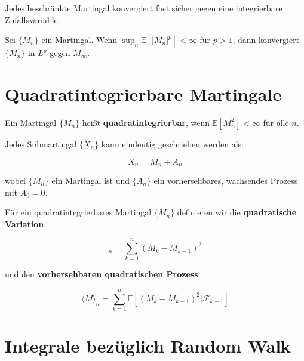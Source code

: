 \begin{corollary}
Jedes beschränkte Martingal konvergiert fast sicher gegen eine integrierbare Zufallsvariable.
\end{corollary}

\begin{theorem}[$L^p$-Konvergenz]
Sei $\{M_n\}$ ein Martingal. Wenn $\sup_n \mathbb{E}[|M_n|^p] < \infty$ für $p > 1$, dann konvergiert $\{M_n\}$ in $L^p$ gegen $M_\infty$.
\end{theorem}

\section{Quadratintegrierbare Martingale}

\begin{definition}
Ein Martingal $\{M_n\}$ heißt \textbf{quadratintegrierbar}, wenn $\mathbb{E}[M_n^2] < \infty$ für alle $n$.
\end{definition}

\begin{theorem}
Jedes Submartingal $\{X_n\}$ kann eindeutig geschrieben werden als:

\begin{equation}
X_n = M_n + A_n
\end{equation}

wobei $\{M_n\}$ ein Martingal ist und $\{A_n\}$ ein vorhersehbares, wachsendes Prozess mit $A_0 = 0$.
\end{theorem}

\begin{definition}
Für ein quadratintegrierbares Martingal $\{M_n\}$ definieren wir die \textbf{quadratische Variation}:

\begin{equation}
[M]_n = \sum_{k=1}^n (M_k - M_{k-1})^2
\end{equation}

und den \textbf{vorhersehbaren quadratischen Prozess}:

\begin{equation}
\langle M \rangle_n = \sum_{k=1}^n \mathbb{E}[(M_k - M_{k-1})^2 | \mathcal{F}_{k-1}]
\end{equation}
\end{definition}

\section{Integrale bezüglich Random Walk}

